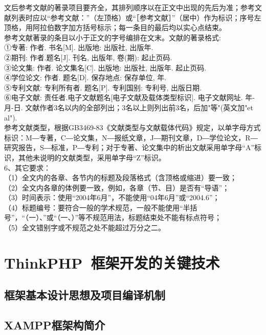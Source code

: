 \documentclass{xmuthesis}
\begin{document}
\begin{flushleft}
文后参考文献的著录项目要齐全，其排列顺序以在正文中出现的先后为准；参考文献列表时应以“参考文献：”（左顶格）或“［参考文献］”（居中）作为标识；序号左顶格，用阿拉伯数字加方括号标示；每一条目的最后均以实心点结束。\\
参考文献著录的条目以小于正文的字号编排在文末。文献的著录格式:\\
    ①专著: 作者. 书名[M]. 出版地: 出版社, 出版年.\\
    ②期刊: 作者.题名[J]. 刊名, 出版年, 卷(期): 起止页码.\\
    ③论文集: 作者. 论文集名[C]. 出版地: 出版社, 出版年. 起止页码.\\
    ④学位论文: 作者. 题名[D]. 保存地点: 保存单位, 年.\\
    ⑤专利文献: 专利所有者. 题名[P]. 专利国别: 专利号, 出版日期.\\
    ⑥电子文献: 责任者.电子文献题名[电子文献及载体类型标识]. 电子文献网址. 年-月-日. 文献作者3名以内的全部列出；3名以上则列出前3名，后加"等"(英文加"et al").\\
    参考文献类型，根据GB3469-83《文献类型与文献载体代码》规定，以单字母方式标识：M―专著，C―论文集，N―报纸文章，J―期刊文章，D―学位论文，R―研究报告，S―标准，P―专利；对于专著、论文集中的析出文献采用单字母“A”标识，其他未说明的文献类型，采用单字母“Z”标识。\\
    6、其它要求：\\
   （1）全文内的各章、各节内的标题及段落格式（含顶格或缩进）要一致；\\
   （2）全文内各章的体例要一致，例如，各章（节、目）是否有“导语”；\\
   （3）时间表示：使用“2004年6月”，不能使用“04年6月”或“2004.6”；\\
   （4）标题编号：要符合一般的学术规范，一般不能使用“半括号”，“（一）、”或“（一、）”等不规范用法，标题结束处不能有标点符号；\\
   （5）全文错别字或不规范之处不能超过万分之二。\\
\newpage
\chapter{ThinkPHP~框架开发的关键技术}

\section{框架基本设计思想及项目编译机制}
\section{XAMPP框架构简介}

\end{flushleft}
\end{document}
